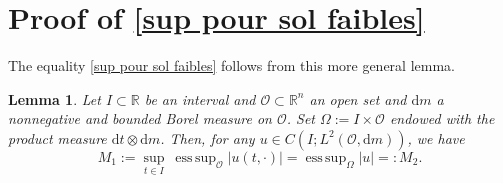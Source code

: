 \documentclass[12pt, letterpaper]{amsart}
\newtheorem{lem}[thm]{Lemma}
\theoremstyle{definition}
\theoremstyle{remark}
\numberwithin{equation}{section}
\DeclareMathOperator*{\supess}{ess\,sup}
\begin{document}
\section{Proof of \texorpdfstring{\eqref{sup pour sol faibles}}{Equation (sup pour sol faibles)}}\label{annexe}
The equality \eqref{sup pour sol faibles} follows from this more general lemma.
\begin{lem}\label{Lemma sup supess = supess}
    Let $I \subset \mathbb{R}$ be an interval and $\mathcal{O} \subset \mathbb{R}^n$ an open set and $\mathrm{d}m$ a nonnegative and bounded Borel measure on $\mathcal{O}$. Set $\Omega:= I \times \mathcal{O}$ endowed with the product measure $\mathrm{d}t \otimes \mathrm{d}m$. Then, for any $u \in C(I;L^2(\mathcal{O},\mathrm{d}m))$, we have 
    \begin{equation*}
        M_1:=\sup_{t \in I} \ \supess_{\mathcal{O}} \left|u(t,\cdot) \right|  = \supess_{\Omega} \left|u \right|=:M_2.
    \end{equation*}
\end{lem}
\end{document}
